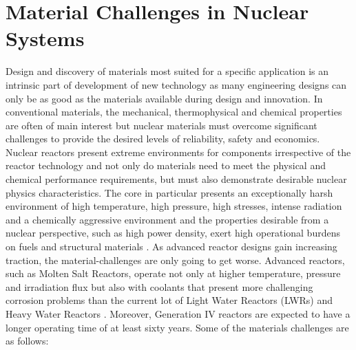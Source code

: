 \section{Material Challenges in Nuclear Systems}
	Design and discovery of materials most suited for a specific application is an intrinsic part of development of new technology as many engineering designs can only be as good as the materials available during design and innovation. In conventional materials, the mechanical, thermophysical and chemical properties are often of main interest but nuclear materials must overcome significant challenges to provide the desired levels of reliability, safety and economics. Nuclear reactors present extreme environments for components irrespective of the reactor technology and not only do materials need to meet the physical and chemical performance requirements, but must also demonstrate desirable nuclear physics characteristics. The core in particular presents an exceptionally harsh environment of high temperature, high pressure, high stresses, intense radiation and a chemically aggressive environment and the properties desirable from a nuclear perspective, such as high power density, exert high operational burdens on fuels and structural materials \cite{Zinkle:2013aa}.  As advanced reactor designs gain increasing traction, the material-challenges are only going to get worse. Advanced reactors, such as Molten Salt Reactors, operate not only at higher temperature, pressure and irradiation flux but also with coolants that present more challenging corrosion problems than the current lot of Light Water Reactors (LWRs) and Heavy Water Reactors \cite{Allen:2010aa}. Moreover, Generation {IV}  reactors are expected to have a longer operating time of at least sixty years. Some of the materials challenges are as follows:
